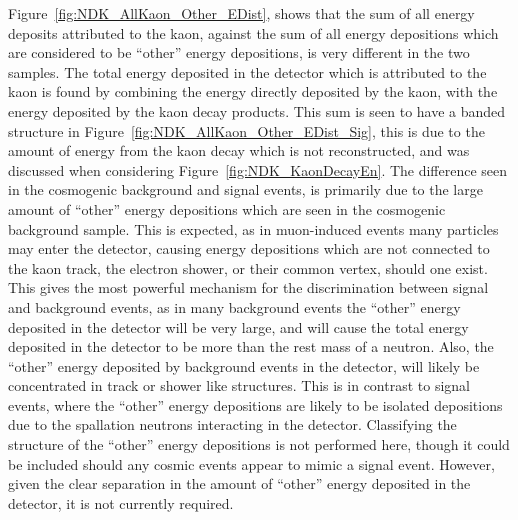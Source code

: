 Figure~\ref{fig:NDK_AllKaon_Other_EDist}, shows that the sum of all energy deposits attributed to the kaon, against the sum of all energy depositions which are considered to be ``other'' energy depositions, is very different in the two samples. The total energy deposited in the detector which is attributed to the kaon is found by combining the energy directly deposited by the kaon, with the energy deposited by the kaon decay products. This sum is seen to have a banded structure in Figure~\ref{fig:NDK_AllKaon_Other_EDist_Sig}, this is due to the amount of energy from the kaon decay which is not reconstructed, and was discussed when considering Figure~\ref{fig:NDK_KaonDecayEn}. The difference seen in the cosmogenic background and signal events, is primarily due to the large amount of ``other'' energy depositions which are seen in the cosmogenic background sample. This is expected, as in muon-induced events many particles may enter the detector, causing energy depositions which are not connected to the kaon track, the electron shower, or their common vertex, should one exist. This gives the most powerful mechanism for the discrimination between signal and background events, as in many background events the ``other'' energy deposited in the detector will be very large, and will cause the total energy deposited in the detector to be more than the rest mass of a neutron. Also, the ``other'' energy deposited by background events in the detector, will likely be concentrated in track or shower like structures. This is in contrast to signal events, where the ``other'' energy depositions are likely to be isolated depositions due to the spallation neutrons interacting in the detector. Classifying the structure of the ``other'' energy depositions is not performed here, though it could be included should any cosmic events appear to mimic a signal event. However, given the clear separation in the amount of ``other'' energy deposited in the detector, it is not currently required. \\

